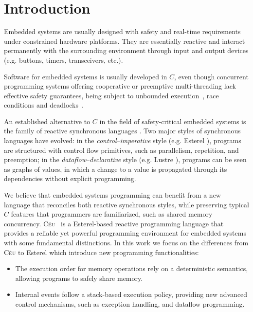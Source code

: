 \documentclass{acm_proc_article-sp}
\newcommand{\CEU}{\textsc{C\'{e}u}\xspace}
\newcommand{\1}{\;}
\newcommand{\2}{\;\;}
\newcommand{\3}{\;\;\;}
\newcommand{\5}{\;\;\;\;\;}
\begin{document}


\section{Introduction}

Embedded systems are usually designed with safety and real-time requirements 
under constrained hardware platforms.
%
They are essentially reactive and interact permanently with the surrounding 
environment through input and output devices (e.g. buttons, timers, 
transceivers, etc.).

Software for embedded systems is usually developed in $C$, even though 
concurrent programming systems offering cooperative or preemptive 
multi-threading lack effective safety guarantees, being subject to unbounded 
execution~\cite{wsn.comparison}, race conditions and 
deadlocks~\cite{sync_async.threadsproblems}.

An established alternative to $C$ in the field of safety-critical embedded 
systems is the family of reactive synchronous languages \cite{rp.twelve}.
Two major styles of synchronous languages have evolved:
in the \emph{control}--\emph{imperative} style (e.g. Esterel 
\cite{esterel.design}), programs are structured with control flow primitives, 
such as parallelism, repetition, and preemption;
in the \emph{dataflow}--\emph{declarative} style (e.g. Lustre 
\cite{lustre.ieee91}), programs can be seen as graphs of values, in which a 
change to a value is propagated through its dependencies without explicit 
programming.

We believe that embedded systems programming can benefit from a new language 
that reconciles both reactive synchronous styles, while preserving typical $C$ 
features that programmers are familiarized, such as shared memory concurrency.
%
\CEU~\cite{ceu.sensys}
is a Esterel-based reactive programming language that provides a reliable yet 
powerful programming environment for embedded systems with some fundamental 
distinctions.
In this work we focus on the differences from \CEU to Esterel which introduce 
new programming functionalities:
%
\begin{itemize}
\item The execution order for memory operations rely on a deterministic 
semantics, allowing programs to safely share memory.
%
\item Internal events follow a stack-based execution policy, providing new 
advanced control mechanisms, such as exception handling, and dataflow 
programming.
\end{itemize}
\end{document}
